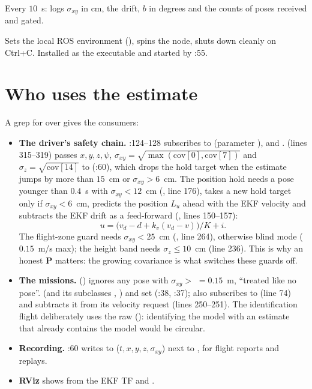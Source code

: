 Every $10$~s: logs $\sigma_{xy}$ in cm, the drift, $b$ in degrees and the counts of poses received and gated.

Sets the local ROS environment (), spins the node, shuts down cleanly on Ctrl+C. Installed as the
executable  and started by :55.

\section{Who uses the estimate}
\label{sec:users}

A grep for  over  gives the consumers:
\begin{itemize}
\item \textbf{The driver's safety chain.} :124--128 subscribes to  (parameter
  ),  and .  (lines 315--319) passes
  $x,y,z,\psi$, $\sigma_{xy} = \sqrt{\max(\text{cov}[0],\text{cov}[7])}$ and $\sigma_z = \sqrt{\text{cov}[14]}$ to
   (:60), which drops the hold target when the estimate jumps by more than
  $15$~cm or $\sigma_{xy} > 6$~cm. The position hold needs a pose younger than $0.4$~s with $\sigma_{xy}<12$~cm
  (, line 176), takes a new hold target only if $\sigma_{xy}<6$~cm, predicts the position
  $L_u$ ahead with the EKF velocity and subtracts the EKF drift as a feed-forward (, lines 150--157):
  \[ u = \big(v_d - d + k_v(v_d - v)\big)/K + i . \]
  The flight-zone guard needs $\sigma_{xy}<25$~cm (, line 264), otherwise blind mode
  ($0.15$~m/s max); the height band needs $\sigma_z \le 10$~cm (line 236). This is why an honest $\mathbf P$ matters: the
  growing covariance is what switches these guards off.
\item \textbf{The missions.}  () ignores any pose with
  $\sigma_{xy} > $  $=0.15$~m, ``treated like no pose''.  (and its subclasses
  , ) and  set  (:38,
  :37);  also subscribes to  (line 74) and subtracts it from its velocity
  request (lines 250--251). The identification flight  deliberately uses the raw
   (): identifying the model with an estimate that already contains the model
  would be circular.
\item \textbf{Recording.} :60 writes  to  ($t,x,y,z,\sigma_{xy}$) next
  to , for flight reports and replays.
\item \textbf{RViz} shows  from the EKF TF and .
\end{itemize}

